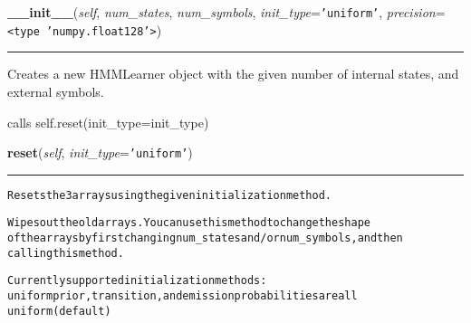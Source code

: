 \hspace{.8\funcindent}\begin{boxedminipage}{\funcwidth}

    \raggedright \textbf{\_\_init\_\_}(\textit{self}, \textit{num\_states}, \textit{num\_symbols}, \textit{init\_type}={\tt \texttt{'}\texttt{uniform}\texttt{'}}, \textit{precision}={\tt {\textless}type 'numpy.float128'{\textgreater}})

    \vspace{-1.5ex}

    \rule{\textwidth}{0.5\fboxrule}
\setlength{\parskip}{2ex}
    Creates a new HMMLearner object with the given number of internal 
    states, and external symbols.

    calls self.reset(init\_type=init\_type)

\setlength{\parskip}{1ex}
    \end{boxedminipage}

    \label{QSTK:qstklearn:hmm:HMMLearner:reset}

    \vspace{0.5ex}

\hspace{.8\funcindent}\begin{boxedminipage}{\funcwidth}

    \raggedright \textbf{reset}(\textit{self}, \textit{init\_type}={\tt \texttt{'}\texttt{uniform}\texttt{'}})

    \vspace{-1.5ex}

    \rule{\textwidth}{0.5\fboxrule}
\setlength{\parskip}{2ex}
\begin{alltt}

Resets the 3 arrays using the given initialization method.

Wipes out the old arrays. You can use this method to change the shape
of the arrays by first changing num\_states and/or num\_symbols, and then
calling this method.

Currently supported initialization methods:
uniform         prior, transition, and emission probabilities are all 
                        uniform (default)
\end{alltt}

\setlength{\parskip}{1ex}
    \end{boxedminipage}

